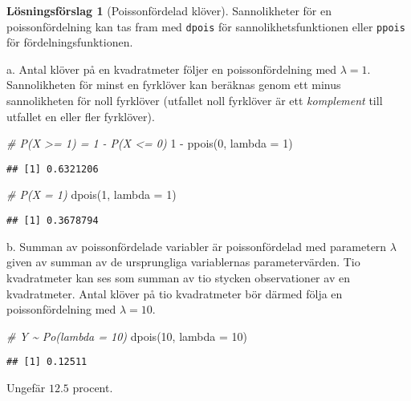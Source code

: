 \documentclass[
]{book}
\newenvironment{Shaded}{\begin{snugshade}}{\end{snugshade}}
\newcommand{\AttributeTok}[1]{\textcolor[rgb]{0.77,0.63,0.00}{#1}}
\newcommand{\CommentTok}[1]{\textcolor[rgb]{0.56,0.35,0.01}{\textit{#1}}}
\newcommand{\DecValTok}[1]{\textcolor[rgb]{0.00,0.00,0.81}{#1}}
\newcommand{\FunctionTok}[1]{\textcolor[rgb]{0.00,0.00,0.00}{#1}}
\newcommand{\NormalTok}[1]{#1}
\newcommand{\SpecialCharTok}[1]{\textcolor[rgb]{0.00,0.00,0.00}{#1}}
\theoremstyle{definition}
\theoremstyle{definition}
\theoremstyle{definition}
\theoremstyle{definition}
\newtheorem{hypothesis}{Lösningsförslag}[chapter]
\theoremstyle{remark}
\begin{document}
\begin{hypothesis}[Poissonfördelad klöver]
Sannolikheter för en poissonfördelning kan tas fram med \texttt{dpois} för sannolikhetsfunktionen eller \texttt{ppois} för fördelningsfunktionen.

a. Antal klöver på en kvadratmeter följer en poissonfördelning med \(\lambda = 1\). Sannolikheten för minst en fyrklöver kan beräknas genom ett minus sannolikheten för noll fyrklöver (utfallet noll fyrklöver är ett \emph{komplement} till utfallet en eller fler fyrklöver).

\begin{Shaded}
\begin{Highlighting}[]
\CommentTok{\# P(X \textgreater{}= 1) = 1 {-} P(X \textless{}= 0)}
\DecValTok{1} \SpecialCharTok{{-}} \FunctionTok{ppois}\NormalTok{(}\DecValTok{0}\NormalTok{, }\AttributeTok{lambda =} \DecValTok{1}\NormalTok{)}
\end{Highlighting}
\end{Shaded}

\begin{verbatim}
## [1] 0.6321206
\end{verbatim}

\begin{Shaded}
\begin{Highlighting}[]
\CommentTok{\# P(X = 1)}
\FunctionTok{dpois}\NormalTok{(}\DecValTok{1}\NormalTok{, }\AttributeTok{lambda =} \DecValTok{1}\NormalTok{)}
\end{Highlighting}
\end{Shaded}

\begin{verbatim}
## [1] 0.3678794
\end{verbatim}

b. Summan av poissonfördelade variabler är poissonfördelad med parametern \(\lambda\) given av summan av de ursprungliga variablernas parametervärden. Tio kvadratmeter kan ses som summan av tio stycken observationer av en kvadratmeter. Antal klöver på tio kvadratmeter bör därmed följa en poissonfördelning med \(\lambda = 10\).

\begin{Shaded}
\begin{Highlighting}[]
\CommentTok{\# Y \textasciitilde{} Po(lambda = 10)}
\FunctionTok{dpois}\NormalTok{(}\DecValTok{10}\NormalTok{, }\AttributeTok{lambda =} \DecValTok{10}\NormalTok{)}
\end{Highlighting}
\end{Shaded}

\begin{verbatim}
## [1] 0.12511
\end{verbatim}

Ungefär \(12.5\) procent.
\end{hypothesis}
\end{document}
